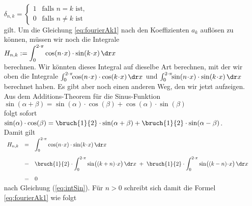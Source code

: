 \\[0.2cm]
\hspace*{1.3cm}
$\delta_{n,k} = \left\{
\begin{array}{ll}
  1 & \mbox{falls $n = k$ ist,} \\
  0 & \mbox{falls $n \not= k$ ist}
\end{array}
\right.
$
\\[0.2cm]
gilt.  Um die Gleichung \ref{eq:fourierAk1} nach den Koeffizienten $a_k$ aufl\"osen zu k\"onnen, m\"ussen wir noch die 
Integrale 
\\[0.3cm]
\hspace*{1.3cm}
$H_{n,k} := \displaystyle\int_0^{2\cdot\pi} \cos(n\!\cdot\!x)\cdot\sin(k\!\cdot\!x)\, \dr x$
\\[0.3cm]
berechnen.  Wir k\"onnten dieses Integral auf dieselbe Art berechnen, mit der wir oben die Integrale
$\int_0^{2\cdot\pi}\!\!\cos(n\!\cdot\!x)\cdot\cos(k\!\cdot\!x)\, \dr x$  und
$\int_0^{2\cdot\pi}\!\!\sin(n\!\cdot\!x)\cdot\sin(k\!\cdot\!x)\, \dr x$  berechnet haben.
Es gibt aber noch einen anderen Weg, den wir jetzt aufzeigen.
Aus dem Additions-Theorem f\"ur die Sinus-Funktion 
\\[0.1cm]
\hspace*{1.3cm}
$\sin(\alpha + \beta) = \sin(\alpha) \cdot \cos(\beta) + \cos(\alpha) \cdot \sin(\beta)$
\\[0.1cm]
folgt sofort 
\\[0.1cm]
\hspace*{1.3cm}
$\sin(\alpha) \cdot \cos(\beta) = \bruch{1}{2} \cdot\sin(\alpha + \beta) + 
                                  \bruch{1}{2} \cdot \sin(\alpha - \beta)$.
\\[0.1cm]
Damit gilt 
\\[0.3cm]
\hspace*{1.3cm}
$
\begin{array}[t]{lcl}
  H_{n,k} & = &\displaystyle\int_0^{2\cdot\pi} \cos(n\!\cdot\!x)\cdot\sin(k\!\cdot\!x)\, \dr x \\[0.5cm]
& = &\displaystyle \bruch{1}{2}\cdot\int_0^{2\cdot\pi} \sin\bigl((k+n)\!\cdot\!x\bigr) \,\dr x \;+\;
                   \bruch{1}{2}\cdot\int_0^{2\cdot\pi} \sin\bigl((k-n)\!\cdot\!x\bigr) \,\dr x  \\[0.5cm]
& = & 0
\end{array}
$
\\[0.3cm]
nach Gleichung (\ref{eq:intSin}).
F\"ur $n>0$ schreibt sich damit die Formel \ref{eq:fourierAk1} wie folgt
\\[0.3cm]
\hspace*{1.3cm}
